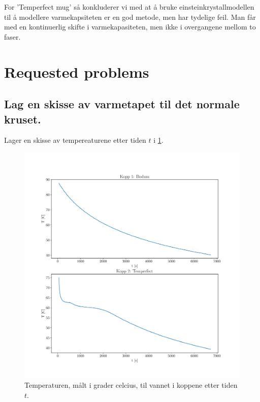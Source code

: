 \documentclass[ reprint, amsmath,amssymb, aps]{revtex4-2}
\begin{document}
For 'Temperfect mug' så konkluderer vi med at å bruke einsteinkrystallmodellen til å modellere varmekapsiteten er en god metode, men har tydelige feil. Man får med en kontinuerlig skifte i varmekapasiteten, men ikke i overgangene mellom to faser. 







\clearpage
\appendix

\section{Requested problems}
\onecolumngrid

\subsection*{Lag en skisse av varmetapet til det normale kruset.}

Lager en skisse av tempereaturene etter tiden $t$ i \ref{tempkopp}.

\begin{figure}
\centering
\includegraphics[scale=0.5]{tempkopp.pdf}
\caption{Temperaturen, målt i grader celcius, til vannet i koppene etter tiden $t$.}
\label{tempkopp}
\end{figure}
\twocolumngrid
\end{document}
